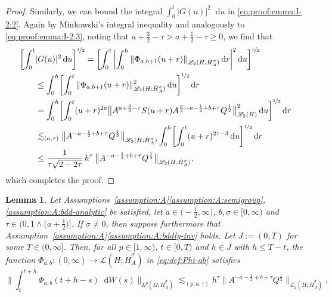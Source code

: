 \documentclass[reqno]{amsart}
\numberwithin{equation}{section}
\newcommand{\rd}{\mathop{}\!\mathrm{d}}
\newcommand{\from}{\colon}
\newcommand{\Hdot}[1]{\dot{H}^{#1}_A}
\newtheorem{lemma}{Lemma}[section]
\theoremstyle{remark}
\theoremstyle{definition}
\begin{document}
\begin{proof}
	Similarly, we can bound the integral $\int_0^t |G(u)|^2 \rd u$ 
	in \eqref{eq:proof:emma:I-2:2}. 
	Again by Minkowski's integral inequality 
	and analogously to \eqref{eq:proof:emma:I-2:3}, 
	noting that $a+\frac{3}{2}-\tau > a + \frac{1}{2} -\tau \geq 0$, we find that   
	\begin{align*}
	\biggl[\int_0^t &|G(u)|^2 \rd u \biggr]^{\nicefrac{1}{2}} 
	= 
	\biggl[\int_0^t \,
	\biggl| \int_0^h 
	\| \Phi_{a,b+1}(u+r) \|_{ \mathscr L_2(H;\Hdot\sigma) } \rd r \biggr|^2 
	\rd u\biggr]^{\nicefrac{1}{2}} 
	\\
	&\leq 
	\int_0^h \biggl[ 
	\int_0^t 
	\| \Phi_{a,b+1}(u+r) \|_{\mathscr L_2(H;\Hdot\sigma)}^2 \rd u
	\biggr]^{\nicefrac{1}{2}} \rd r 
	\\
	&= 
	\int_0^h \biggl[ 
	\int_0^t (u+r)^{2a} 
	\bigl\| A^{a+\frac{3}{2}-\tau} S(u+r) 
	A^{ \frac{\sigma}{2}-a-\frac{1}{2}+b+\tau} Q^{\frac{1}{2}} \bigr\|_{ 
		\mathscr L_2(H)}^2 
	\rd u\biggr]^{\nicefrac{1}{2}} \rd r 
	\\
	&\lesssim_{(a,\tau)}
	\bigl\| A^{-a-\frac{1}{2}+b+\tau} Q^{\frac{1}{2}} \bigr\|_{ 
		\mathscr L_2(H;\Hdot\sigma)} 
	\int_0^h \biggl[ 
	\int_0^t 
	(u+r)^{2\tau-3} 
	\rd u\biggr]^{\nicefrac{1}{2}} \rd r 
	\\
	&\leq 
	\frac{1}{\tau \sqrt{2 - 2\tau}} \, 
	h^\tau \, 
	\bigl\| A^{-a-\frac{1}{2}+b+\tau} Q^{\frac{1}{2}} \bigr\|_{ 
		\mathscr L_2(H;\Hdot\sigma)} ,
	\end{align*}
	which completes the proof. 
\end{proof}

\begin{lemma}\label{lemma:I-2}
	Let 
	Assumptions~\textup{\ref{assumption:A}\ref{assumption:A:semigroup},\ref{assumption:A:bdd-analytic}} 
	be satisfied, let $a \in \bigl(-\frac{1}{2},\infty\bigr)$, 
	${b, \sigma \in [0,\infty)}$ 
	and $\tau\in \bigl( 0, 1 \wedge \bigl( a+\frac{1}{2} \bigr) \bigr]$. 
	If $\sigma \neq 0$, then suppose 
	furthermore that
	Assumption~\textup{\ref{assumption:A}\ref{assumption:A:bddly-inv}} 
	holds. 
	Let $J:=(0,T)$ 
	for some $T \in (0,\infty]$. 
	Then, 
	for all $p \in [1,\infty)$, 
	$t \in [0,T)$ and $h \in J$ 
	with $h\leq T-t$, 
	the function 
	$\Phi_{a,b}\from(0,\infty)\to\mathscr L(H; \Hdot{\sigma})$ 
	in \eqref{eq:def:Phi-ab} 
	satisfies 
	\[ 
	\biggl\| 
	\int_t^{t+h} \Phi_{a,b}(t+h-s) \rd W(s) 
	\biggr\|_{L^p(\Omega;\dot H_A^\sigma)} 
	\lesssim_{(p,a,\tau)}  
	h^\tau  
	\bigl\| A^{-a-\frac{1}{2}+b+\tau } 
	Q^{\frac{1}{2}}\bigr\|_{ \mathscr L_2(H;\Hdot \sigma) }. 
	\] 
\end{lemma}
\end{document}
